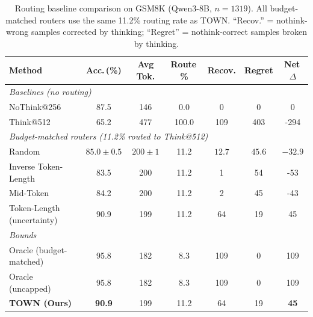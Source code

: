 \begin{table}[t]
\centering
\caption{Routing baseline comparison on GSM8K (Qwen3-8B, $n{=}1319$). All budget-matched routers use the same 11.2\% routing rate as TOWN. ``Recov.'' = nothink-wrong samples corrected by thinking; ``Regret'' = nothink-correct samples broken by thinking.}
\label{tab:routing_baselines}
\small
\begin{tabular}{@{}lcccccc@{}}
\toprule
Method & Acc.\,(\%) & Avg Tok. & Route\,\% & Recov. & Regret & Net\,$\Delta$ \\
\midrule
\multicolumn{7}{l}{\textit{Baselines (no routing)}} \\
NoThink@256 & 87.5 & 146 & 0.0 & 0 & 0 & 0 \\
Think@512 & 65.2 & 477 & 100.0 & 109 & 403 & -294 \\
\midrule
\multicolumn{7}{l}{\textit{Budget-matched routers (11.2\% routed to Think@512)}} \\
Random & $85.0 \pm 0.5$ & $200 \pm 1$ & 11.2 & $12.7$ & $45.6$ & $-32.9$ \\
Inverse Token-Length & 83.5 & 200 & 11.2 & 1 & 54 & -53 \\
Mid-Token & 84.2 & 200 & 11.2 & 2 & 45 & -43 \\
Token-Length (uncertainty) & 90.9 & 199 & 11.2 & 64 & 19 & 45 \\
\midrule
\multicolumn{7}{l}{\textit{Bounds}} \\
Oracle (budget-matched) & 95.8 & 182 & 8.3 & 109 & 0 & 109 \\
Oracle (uncapped) & 95.8 & 182 & 8.3 & 109 & 0 & 109 \\
\midrule
\textbf{TOWN (Ours)} & \textbf{90.9} & 199 & 11.2 & 64 & 19 & \textbf{45} \\
\bottomrule
\end{tabular}
\end{table}
